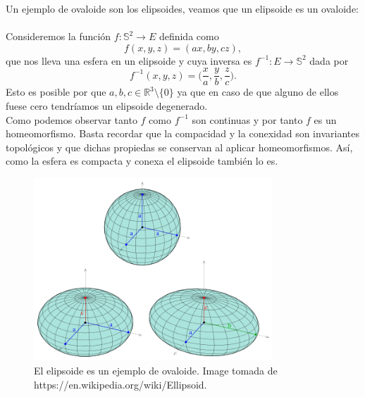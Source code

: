 \begin{ejemplo} 
	
	Un ejemplo de ovaloide son los elipsoides, veamos que un elipsoide es un ovaloide:
${ }$\\

	Consideremos la función $f : \mathbb{S}^2 \to E$ definida como
	\[
		f(x,y,z) = (ax,by,cz),
	\]
	que nos lleva una esfera en un elipsoide y cuya inversa es $f^{-1} : E \to \mathbb{S}^2$ dada por
	\[
		f^{-1} (x,y,z) = \Big(\frac x a, \frac y b, \frac z c \Big).
	\]
	Esto es posible por que $a,b,c \in \mathbb{R}^3 \setminus \{0\}$ ya que en caso de que alguno de ellos fuese cero tendríamos un elipsoide degenerado.
	${ }$\\
	
	Como podemos observar tanto $f$ como $f^{-1}$ son continuas y por tanto $f$ es un homeomorfismo. Basta recordar que la compacidad y la conexidad son invariantes topológicos y que dichas propiedas se conservan al aplicar homeomorfismos. Así, como la esfera es compacta y conexa el elipsoide también lo es.
	
	
	
		\begin{figure}[h]
			\begin{center}
				\includegraphics[width=0.8\textwidth]{imagenes/ellipsoid.png}
			\end{center}
			\caption{El elipsoide es un ejemplo de ovaloide. Image tomada de https://en.wikipedia.org/wiki/Ellipsoid.}
			\label{fig:etiq_3}
		\end{figure}
		

\end{ejemplo}
